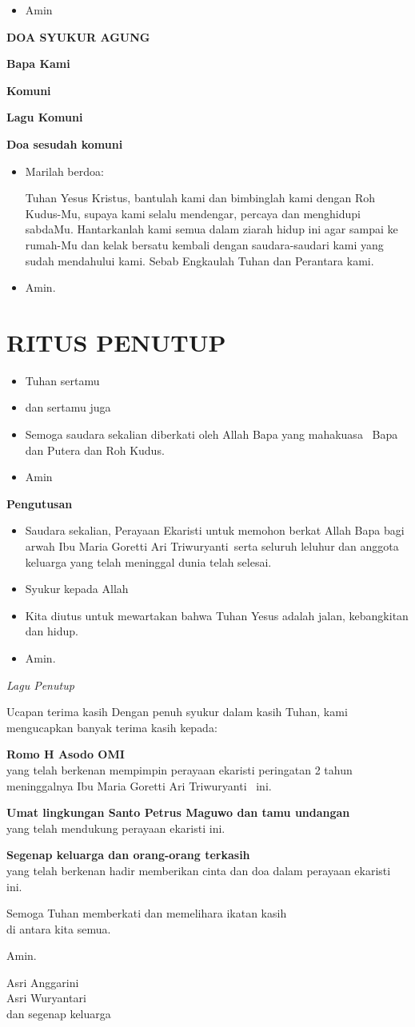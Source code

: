\documentclass[a5paper,headsepline,titlepage,11pt,normalheadings,DIVcalc]{scrbook}
\makeatletter
\newcommand{\subjudul}[1]{%
  {\parindent \z@ 
    \interlinepenalty\@M \bfseries #1\par\nobreak \vskip 10\p@ }}
\newcommand{\lagu}[1]{%
  {\parindent \z@ 
    \interlinepenalty\@M \slshape \mdseries \Large \textit{#1}\par\nobreak \vskip 10\p@ }}
\newcommand{\BU}[1]{\begin{itemize} \item[U:] #1 \end{itemize}}
\newcommand{\BI}[1]{\begin{itemize} \item[I:] #1 \end{itemize}}
\newcommand{\namaalm}{Ibu Maria Goretti Ari Triwuryanti~}
\newcommand{\namaromo}{H Asodo OMI~}
\makeatother
\begin{document}
\BU{Amin} 

\subjudul{DOA SYUKUR AGUNG}

\subjudul{Bapa Kami}

\subjudul{Komuni}

\subjudul{Lagu Komuni}
 
\subjudul{Doa sesudah komuni}

\BI{Marilah berdoa: 

Tuhan Yesus Kristus, bantulah kami dan bimbinglah kami
dengan Roh Kudus-Mu, supaya kami selalu mendengar,
percaya dan menghidupi sabdaMu. Hantarkanlah kami
semua dalam ziarah hidup ini agar sampai ke rumah-Mu
dan kelak bersatu kembali dengan saudara-saudari kami
yang sudah mendahului kami. Sebab Engkaulah Tuhan
dan Perantara kami.
}

\BU{Amin.}

\section*{RITUS PENUTUP}

\BI{Tuhan sertamu}

\BU{dan sertamu juga}

\BI{Semoga saudara sekalian diberkati oleh Allah Bapa yang 
mahakuasa \Cross ~Bapa dan Putera dan Roh Kudus.}

\BU{Amin}

 

\subjudul{Pengutusan}

\BI{Saudara sekalian, Perayaan Ekaristi untuk memohon 
berkat Allah Bapa bagi arwah \namaalm serta seluruh leluhur dan anggota keluarga yang 
telah meninggal dunia telah selesai.}

\BU{Syukur kepada Allah}

\BI{Kita diutus untuk mewartakan bahwa Tuhan Yesus adalah 
jalan, kebangkitan dan hidup.}

\BU{Amin.}

 

\lagu{Lagu Penutup}


\newpage
\begin{flushright}
{\Large Ucapan terima kasih}
\noindent Dengan penuh syukur dalam kasih Tuhan, kami mengucapkan banyak
terima kasih kepada:
\large

\textbf{Romo \namaromo}\\
yang telah berkenan mempimpin perayaan ekaristi peringatan 2 tahun meninggalnya \namaalm
ini.

\textbf{Umat lingkungan Santo Petrus Maguwo dan tamu undangan}\\
yang telah mendukung perayaan ekaristi ini.

\textbf{Segenap keluarga dan orang-orang terkasih}\\
yang telah berkenan hadir memberikan cinta dan doa dalam perayaan
ekaristi ini.

Semoga Tuhan memberkati dan memelihara ikatan kasih\\ di antara kita semua.

Amin.

\bigskip 

Asri Anggarini\\
Asri Wuryantari\\
dan segenap keluarga
\end{flushright}
\end{document}
